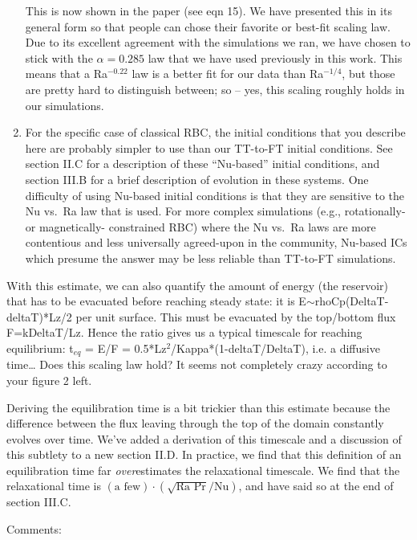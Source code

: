\documentclass[aps, 11pt, singlecolumn]{revtex4-1} %
\begin{document}
\begin{singlespace}
\begin{enumerate}
This is now shown in the paper (see eqn 15).
We have presented this in its general form so that people can chose their favorite or best-fit scaling law.
Due to its excellent agreement with the simulations we ran, we have chosen to stick with the $\alpha = 0.285$ law that we have used previously in this work.
This means that a Ra$^{-0.22}$ law is a better fit for our data than Ra$^{-1/4}$, but those are pretty hard to distinguish between; so -- yes, this scaling roughly holds in our simulations.
\item For the specific case of classical RBC, the initial conditions that you describe here are probably simpler to use than our TT-to-FT initial conditions.
See section II.C for a description of these ``Nu-based'' initial conditions, and section III.B for a brief description of evolution in these systems.
One difficulty of using Nu-based initial conditions is that they are sensitive to the Nu vs.~Ra law that is used.
For more complex simulations (e.g., rotationally- or magnetically- constrained RBC) where the Nu vs.~Ra laws are more contentious and less universally agreed-upon in the community, Nu-based ICs which presume the answer may be less reliable than TT-to-FT simulations.
\end{enumerate}


\begin{myquotation}
With this estimate, we can also quantify the amount of energy (the reservoir) that has to be evacuated before reaching steady state: it is E$\sim$rhoCp(DeltaT-deltaT)*Lz/2 per unit surface. 
This must be evacuated by the top/bottom flux F=kDeltaT/Lz. 
Hence the ratio gives us a typical timescale for reaching equilibrium: t$_{eq}$ = E/F = 0.5*Lz$^2$/Kappa*(1-deltaT/DeltaT), i.e. a diffusive time…
Does this scaling law hold? It seems not completely crazy according to your figure 2 left.
\end{myquotation}
Deriving the equilibration time is a bit trickier than this estimate because the difference between the flux leaving through the top of the domain constantly evolves over time.
We've added a derivation of this timescale and a discussion of this subtlety to a new section II.D.
In practice, we find that this definition of an equilibration time far \emph{over}estimates the relaxational timescale.
We find that the relaxational time is $(\text{a few})\cdot(\sqrt{\text{Ra Pr}}/\text{Nu})$, and have said so at the end of section III.C.

\begin{myquotation}
Comments:


\end{myquotation}
\end{singlespace}
\end{document}

